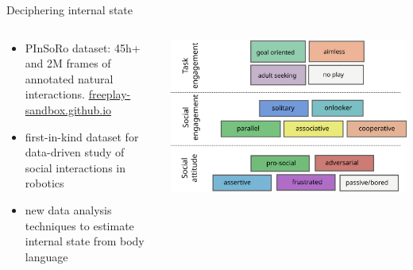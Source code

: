 \documentclass[xcolor=table]{beamer}
\begin{document}
{\begin{frame}{Deciphering internal state}
\begin{columns}
\begin{column}{0.5\linewidth}
        \end{column}
    \end{columns}
\begin{columns}
    \begin{column}{0.5\linewidth}
        {\scriptsize
        \begin{itemize}
            \item PInSoRo dataset: 45h+ and 2M frames of annotated natural
                interactions. \url{freeplay-sandbox.github.io}
            \item first-in-kind dataset for data-driven study of social
                interactions in robotics
            \item new data analysis techniques to estimate internal state from body language
        \end{itemize}
        }
    \end{column}
    \begin{column}{0.5\linewidth}
            \includegraphics[width=\columnwidth]{pinsoro/coding-scheme}
    \end{column}
\end{columns}

\end{frame}
}




\end{document}
